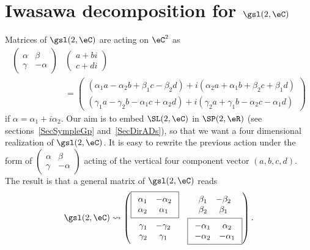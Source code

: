 \section{Iwasawa decomposition for \texorpdfstring{$\gsl(2,\eC)$}{sl2C}}		\label{SecIwasldeuxC}

Matrices of $\gsl(2,\eC)$ are acting on $\eC^2$ as
\[
\begin{split}
  \begin{pmatrix}
\alpha&\beta\\\gamma&-\alpha
\end{pmatrix}&
\begin{pmatrix}
a+bi\\c+di
\end{pmatrix}\\
&=
\begin{pmatrix}
(\alpha_1a-\alpha_2b+\beta_1c-\beta_2d)+i(\alpha_2a+\alpha_1b+\beta_2c+\beta_1d)\\
(\gamma_1a-\gamma_2b-\alpha_1c+\alpha_2d)+i(\gamma_2a+\gamma_1b-\alpha_2c-\alpha_1d)
\end{pmatrix}
\end{split}
\]
if $\alpha=\alpha_1+i\alpha_2$.  Our aim is to embed $\SL(2,\eC)$ in $\SP(2,\eR)$ (see sections~\ref{SecSympleGp} and~\ref{SecDirADs}), so that we want a four dimensional realization of $\gsl(2,\eC)$. It is easy to rewrite the previous action under the form of $\begin{pmatrix}
\alpha&\beta\\\gamma&-\alpha
\end{pmatrix}$ acting of the vertical four component vector $(a,b,c,d)$. The result is that a general matrix of $\gsl(2,\eC)$ reads
\begin{equation}		\label{EqGenslMatr}
\gsl(2,\eC)\leadsto
\begin{pmatrix}
\boxed{
\begin{array}{cc}
\alpha_1&-\alpha_2\\
\alpha_2&\alpha_1
\end{array}
}&
\begin{array}{cc}
\beta_1&-\beta_2\\
\beta_2&\beta_1
\end{array}\\
\begin{array}{cc}
\gamma_1&-\gamma_2\\
\gamma_2&\gamma_1
\end{array}&
\boxed{
\begin{array}{cc}
-\alpha_1&\alpha_2\\
-\alpha_2&-\alpha_1
\end{array}
}
\end{pmatrix}.
\end{equation}
